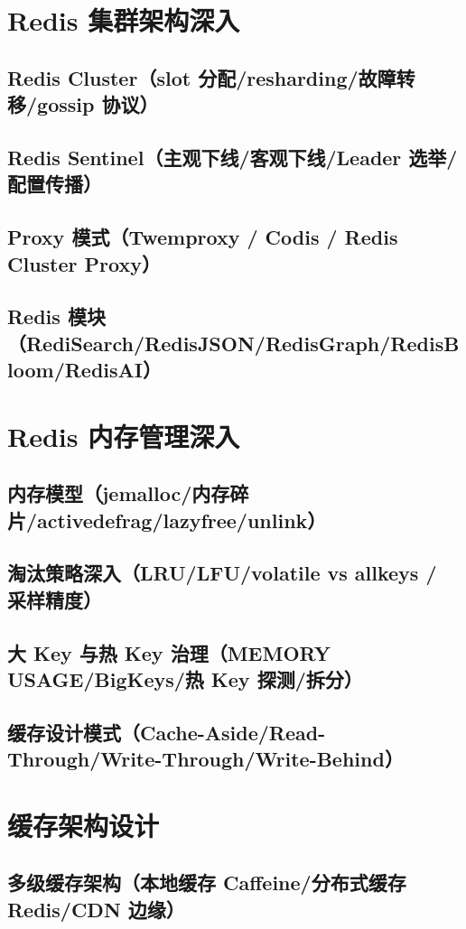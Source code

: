 \documentclass[12pt,UTF8]{ctexbook}
\begin{document}
  \section{Redis 集群架构深入}
    \subsection{Redis Cluster（slot 分配/resharding/故障转移/gossip 协议）}
    \subsection{Redis Sentinel（主观下线/客观下线/Leader 选举/配置传播）}
    \subsection{Proxy 模式（Twemproxy / Codis / Redis Cluster Proxy）}
    \subsection{Redis 模块（RediSearch/RedisJSON/RedisGraph/RedisBloom/RedisAI）}

  \section{Redis 内存管理深入}
    \subsection{内存模型（jemalloc/内存碎片/activedefrag/lazyfree/unlink）}
    \subsection{淘汰策略深入（LRU/LFU/volatile vs allkeys / 采样精度）}
    \subsection{大 Key 与热 Key 治理（MEMORY USAGE/BigKeys/热 Key 探测/拆分）}
    \subsection{缓存设计模式（Cache-Aside/Read-Through/Write-Through/Write-Behind）}

  \section{缓存架构设计}
    \subsection{多级缓存架构（本地缓存 Caffeine/分布式缓存 Redis/CDN 边缘）}
\end{document}
